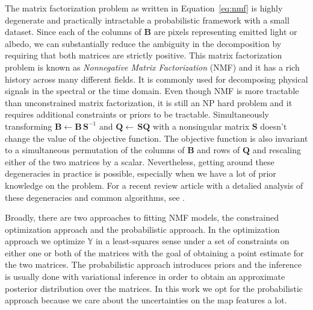 \documentclass[modern]{aastex62}
\begin{document}
The matrix factorization problem as written in Equation~\ref{eq:nmf} is highly degenerate and practically intractable a probabilistic framework with a small dataset.
Since each of the columns of $\mathbf{B}$ are pixels representing emitted light or albedo, we can substantially reduce the ambiguity in the decomposition by requiring that both matrices are strictly positive.
This matrix factorization problem is known as \emph{Nonnegative Matrix Factorization} (NMF) \citep{paatero_positive_1994,lee_algorithms_2001} and it has a rich history across many different fields.
It is commonly used for decomposing physical signals in the spectral or the time domain.
Even though NMF is more tractable than unconstrained matrix factorization, it is still an NP hard problem \citep{vavasis_complexity_2009} and it requires additional constraints or priors to be tractable.
Simultaneously transforming $\mathbf{B}\leftarrow \mathbf{B}\,\mathbf{S}^{-1}$ and
$\mathbf{Q}\leftarrow \,\mathbf{S}\mathbf{Q}$ with a nonsingular matrix $\mathbf{S}$ doesn't change the value of the objective function.
The objective function is also invariant to a simultaneous permutation of the columns of $\mathbf{B}$ and rows of $\mathbf{Q}$ and rescaling either of the two matrices by a scalar.
Nevertheless, getting around these degeneracies in practice is possible, especially when we have a lot of prior knowledge on the problem.
For a recent review article with a detalied analysis of these degeneracies and common algorithms, see \cite{fu_nonnegative_2019}.


Broadly, there are two approaches to fitting NMF models, the constrained optimization approach and the probabilistic approach.
In the optimization approach we optimize $\mathbb{Y}$ in a least-squares sense under a set of constraints on either one or both of the matrices \citep[see][for recent examples from the astronomical literature]{acosta-pulido_new_2017, melchior_scarlet_2018,ren_non-negative_2018,ren_using_2020} with the goal of obtaining a point estimate for the two matrices.
The probabilistic approach introduces priors and the inference is usually done with variational inference in order to obtain an approximate posterior distribution over the matrices.
In this work we opt for the probabilistic approach because we care about the uncertainties on the map features a lot.
\end{document}
